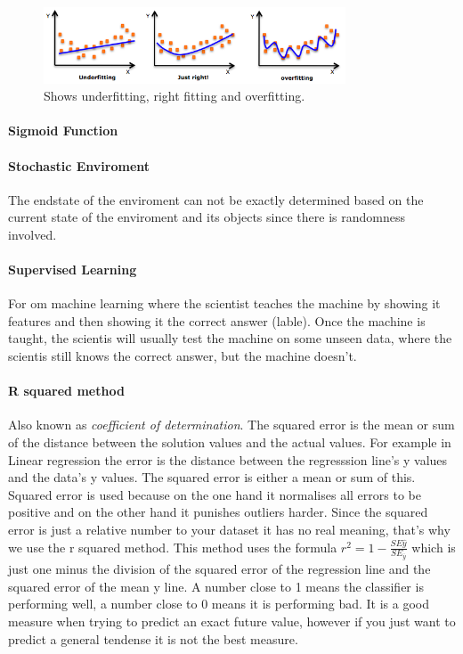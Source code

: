 \begin{figure}
\centering
\includegraphics[width=0.8\textwidth]{images/svm-overfitting.png}
\caption{\label{fig:svm-overfitting} Shows underfitting, right fitting and overfitting.}
\end{figure}

\paragraph{Sigmoid Function}

\paragraph{Stochastic Enviroment}
The endstate of the enviroment can not be exactly determined based on the current state of the enviroment and its objects since there is randomness involved.

\paragraph{Supervised Learning} 
For om machine learning where the scientist teaches the machine by showing it features and then showing it the correct answer (lable). Once the machine is taught, the scientis will usually test the machine on some unseen data, where the scientis still knows the correct answer, but the machine doesn't.

\paragraph{R squared method}
Also known as \emph{coefficient of determination}. The squared error is the mean or sum of the distance between the solution values and the actual values. For example in Linear regression the error is the distance between the regresssion line's y values and the data's y values. The squared error is either a mean or sum of this. Squared error is used because on the one hand it normalises all errors to be positive and on the other hand it punishes outliers harder. Since the squared error is just a relative number to your dataset it has no real meaning, that's why we use the r squared method. This method uses the formula $r^2 = 1 - \frac{SE\hat{y}}{SE_{\overline{y}}}$ which is just one minus the division of the squared error of the regression line and the squared error of the mean y line. A number close to 1 means the classifier is performing well, a number close to 0 means it is performing bad. It is a good measure when trying to predict an exact future value, however if you just want to predict a general tendense it is not the best measure.

